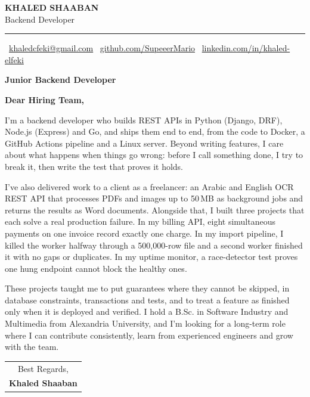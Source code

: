 \documentclass[11pt,a4paper]{article}
\begin{document}
{\fontsize{22}{26}\selectfont\bfseries KHALED SHAABAN}\\[2pt]
{\large Backend Developer}

\vspace{-0.6em}\textcolor{ink!60}{\rule{\linewidth}{0.6pt}}\par\vspace{-0.4em}

\small
\faEnvelope\ \href{mailto:khaledcfeki@gmail.com}{khaledcfeki@gmail.com}\hfill
\faGithub\ \href{https://github.com/SupeeerMario}{github.com/SupeeerMario}\hfill
\faLinkedin\ \href{https://linkedin.com/in/khaled-elfeki}{linkedin.com/in/khaled-elfeki}
\normalsize

\vspace{6pt}
\begin{tcolorbox}[enhanced,colback=white,colframe=white,arc=0pt,boxrule=0pt,
  left=1.2cm,right=1.2cm,  top=1.2cm,bottom=5.5cm,
  overlay={\fill[ink] ([xshift=-2pt,yshift=-1.05cm]frame.north west) rectangle ++(5pt,-1.7cm);}]
\setlength{\parskip}{1.1em}\raggedright
{\large\bfseries Junior Backend Developer}

\textbf{Dear Hiring Team,}\par\vspace{-0.7em}

I'm a backend developer who builds REST APIs in Python (Django, DRF), Node.js (Express) and Go, and ships them end to end, from the code to Docker, a GitHub Actions pipeline and a Linux server. Beyond writing features, I care about what happens when things go wrong: before I call something done, I try to break it, then write the test that proves it holds.

I've also delivered work to a client as a freelancer: an Arabic and English OCR REST API that processes PDFs and images up to 50\,MB as background jobs and returns the results as Word documents. Alongside that, I built three projects that each solve a real production failure. In my billing API, eight simultaneous payments on one invoice record exactly one charge. In my import pipeline, I killed the worker halfway through a 500,000-row file and a second worker finished it with no gaps or duplicates. In my uptime monitor, a race-detector test proves one hung endpoint cannot block the healthy ones.

These projects taught me to put guarantees where they cannot be skipped, in database constraints, transactions and tests, and to treat a feature as finished only when it is deployed and verified. I hold a B.Sc. in Software Industry and Multimedia from Alexandria University, and I'm looking for a long-term role where I can contribute consistently, learn from experienced engineers and grow with the team.

\vspace{1.5em}
\hfill\begin{tabular}{c}
Best Regards,\\[6pt]
{\large\bfseries Khaled Shaaban}
\end{tabular}\hspace{1cm}
\end{tcolorbox}
\end{document}
